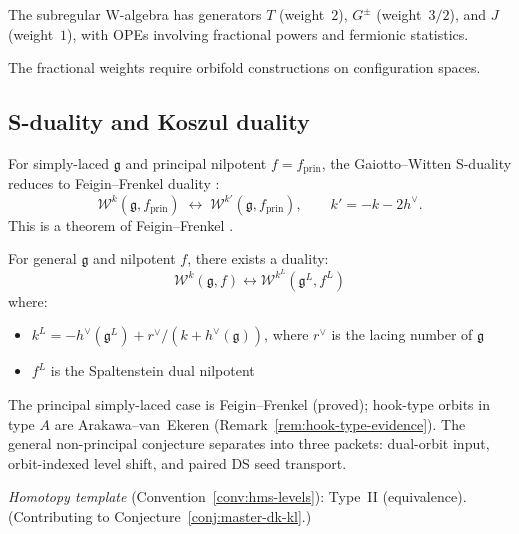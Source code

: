 \begin{theorem}\label{thm:w-algebra-sl4}
The subregular W-algebra has generators $T$ (weight~$2$), $G^{\pm}$ (weight~$3/2$), and $J$ (weight~$1$), with OPEs involving fractional powers and fermionic statistics.
\end{theorem}

The fractional weights require orbifold constructions on configuration spaces.

\subsection{S-duality and Koszul duality}

\begin{theorem}\label{thm:ff-s-duality}
For simply-laced $\mathfrak{g}$ and principal nilpotent $f = f_{\mathrm{prin}}$,
the Gaiotto--Witten S-duality reduces to Feigin--Frenkel duality
\cite{Feigin-Frenkel}:
\[
\mathcal{W}^k(\mathfrak{g}, f_{\mathrm{prin}})
\;\longleftrightarrow\;
\mathcal{W}^{k'}(\mathfrak{g}, f_{\mathrm{prin}}),
\qquad k' = -k - 2h^{\vee}.
\]
This is a theorem of Feigin--Frenkel \cite{Feigin-Frenkel}.
\end{theorem}

\begin{conjecture}\label{conj:gw-s-duality}
For general $\mathfrak{g}$ and nilpotent $f$, there exists a duality:
\[
\mathcal{W}^k(\mathfrak{g}, f) \longleftrightarrow \mathcal{W}^{k^L}(\mathfrak{g}^L, f^L)
\]
where:
\begin{itemize}
\item $k^L = -h^{\vee}(\mathfrak{g}^L) + r^{\vee}/(k + h^{\vee}(\mathfrak{g}))$, where $r^{\vee}$ is the lacing number of $\mathfrak{g}$
\item $f^L$ is the Spaltenstein dual nilpotent
\end{itemize}
\end{conjecture}

\begin{remark}[Scope]
The principal simply-laced case is Feigin--Frenkel \cite{Feigin-Frenkel} (proved); hook-type orbits in type $A$ are Arakawa--van~Ekeren \cite{AvE23} (Remark~\ref{rem:hook-type-evidence}).  The general non-principal conjecture separates into three packets: dual-orbit input, orbit-indexed level shift, and paired DS seed transport.

\emph{Homotopy template} (Convention~\ref{conv:hms-levels}): Type~II (equivalence).  (Contributing to Conjecture~\ref{conj:master-dk-kl}.)
\end{remark}

